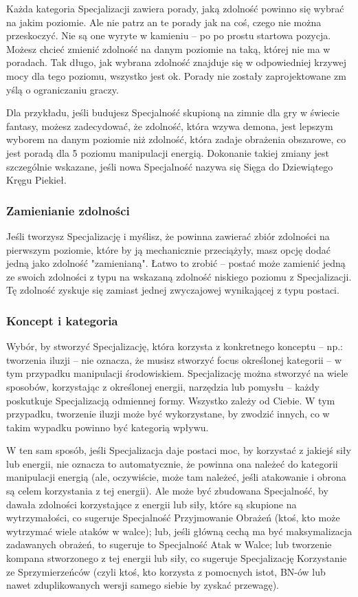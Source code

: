 Każda kategoria Specjalizacji zawiera porady, jaką zdolność powinno się wybrać na jakim poziomie. Ale nie patrz an te porady jak na coś, czego nie można przeskoczyć. Nie są one wyryte w kamieniu – po po prostu startowa pozycja. Możesz chcieć zmienić zdolność na danym poziomie na taką, której nie ma w poradach. Tak długo, jak wybrana zdolność znajduje się w odpowiedniej krzywej mocy dla tego poziomu, wszystko jest ok. Porady nie zostały zaprojektowane zm yślą o ograniczaniu graczy.

Dla przykładu, jeśli budujesz Specjalność skupioną na zimnie dla gry w świecie fantasy, możesz zadecydować, że zdolność, która wzywa demona, jest lepszym wyborem na danym poziomie niż zdolność, która zadaje obrażenia obszarowe, co jest poradą dla 5 poziomu manipulacji energią. Dokonanie takiej zmiany jest szczególnie wskazane, jeśli nowa Specjalność nazywa się Sięga do Dziewiątego Kręgu Piekieł.

\subsubsection{Zamienianie zdolności}

Jeśli tworzysz Specjalizację i myślisz, że powinna zawierać zbiór zdolności na pierwszym poziomie, które by ją mechanicznie przeciążyły, masz opcję dodać jedną jako zdolność "zamienianą". Łatwo to zrobić – postać może zamienić jedną ze swoich zdolności z typu na wskazaną zdolność niskiego poziomu z Specjalizacji. Tę zdolność zyskuje się zamiast jednej zwyczajowej wynikającej z typu postaci.

\subsubsection{Koncept i kategoria}

Wybór, by stworzyć Specjalizację, która korzysta z konkretnego konceptu – np.: tworzenia iluzji – nie oznacza, że musisz stworzyć focus określonej kategorii – w tym przypadku manipulacji środowiskiem. Specjalizację można stworzyć na wiele sposobów, korzystając z określonej energii, narzędzia lub pomysłu – każdy poskutkuje Specjalizacją odmiennej formy. Wszystko zależy od Ciebie. W tym przypadku, tworzenie iluzji może być wykorzystane, by zwodzić innych, co w takim wypadku powinno być kategorią wpływu.

W ten sam sposób, jeśli Specjalizacja daje postaci moc, by korzystać z jakiejś siły lub energii, nie oznacza to automatycznie, że powinna ona należeć do kategorii manipulacji energią (ale, oczywiście, może tam należeć, jeśli atakowanie i obrona są celem korzystania z tej energii). Ale może być zbudowana Specjalność, by dawała zdolności korzystające z energii lub siły, które są skupione na wytrzymałości, co sugeruje Specjalność Przyjmowanie Obrażeń (ktoś, kto może wytrzymać wiele ataków w walce); lub, jeśli główną cechą ma być maksymalizacja zadawanych obrażeń, to sugeruje to Specjalność Atak w Walce; lub tworzenie kompana stworzonego z tej energii lub siły, co sugeruje Specjalizację Korzystanie ze Sprzymierzeńców (czyli ktoś, kto korzysta z pomocnych istot, BN-ów lub nawet zduplikowanych wersji samego siebie by zyskać przewagę).

